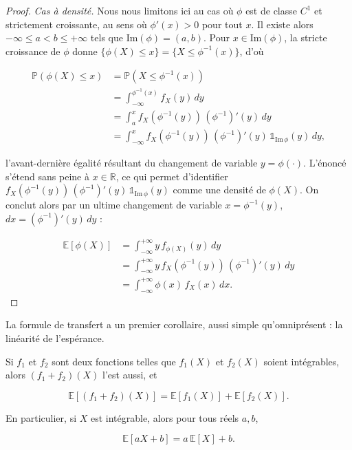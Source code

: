 \begin{proof}
\textit{Cas à densité.} Nous nous limitons ici au cas où $\phi$ est de classe $C^1$ et strictement croissante, au sens où $\phi'(x) > 0$ pour tout $x$. Il existe alors $-\infty \leq a < b \leq +\infty$ tels que $\text{Im}(\phi) = (a, b)$. Pour $x \in \text{Im}(\phi)$, la stricte croissance de $\phi$ donne $\{\phi(X) \leq x\} = \{X \leq \phi^{-1}(x)\}$, d'où

\begin{align*}
\mathbb{P}(\phi(X) \leq x) &= \mathbb{P}(X \leq \phi^{-1}(x)) \\
&= \int_{-\infty}^{\phi^{-1}(x)} f_X(y)\, dy \\
&= \int_a^x f_X(\phi^{-1}(y))\, (\phi^{-1})'(y)\, dy \\
&= \int_{-\infty}^x f_X(\phi^{-1}(y))\, (\phi^{-1})'(y)\, \mathbb{1}_{\text{Im}\,\phi}(y)\, dy,
\end{align*}

l'avant-dernière égalité résultant du changement de variable $y = \phi(\cdot)$. L'énoncé s'étend sans peine à $x \in \mathbb{R}$, ce qui permet d'identifier $f_X(\phi^{-1}(y))\, (\phi^{-1})'(y)\, \mathbb{1}_{\text{Im}\,\phi}(y)$ comme une densité de $\phi(X)$. On conclut alors par un ultime changement de variable $x = \phi^{-1}(y)$, $dx = (\phi^{-1})'(y)\, dy$ :

\begin{align*}
\mathbb{E}[\phi(X)] &= \int_{-\infty}^{+\infty} y\, f_{\phi(X)}(y)\, dy \\
&= \int_{-\infty}^{+\infty} y\, f_X(\phi^{-1}(y))\, (\phi^{-1})'(y)\, dy \\
&= \int_{-\infty}^{+\infty} \phi(x)\, f_X(x)\, dx.
\end{align*}
\end{proof}

La formule de transfert a un premier corollaire, aussi simple qu'omniprésent : la linéarité de l'espérance.

\medskip

\begin{mdframed}
\begin{corollaire}
Si $f_1$ et $f_2$ sont deux fonctions telles que $f_1(X)$ et $f_2(X)$ soient intégrables, alors $(f_1 + f_2)(X)$ l'est aussi, et

$$
\mathbb{E}[(f_1 + f_2)(X)] = \mathbb{E}[f_1(X)] + \mathbb{E}[f_2(X)].
$$

En particulier, si $X$ est intégrable, alors pour tous réels $a, b$,

$$
\mathbb{E}[aX + b] = a\, \mathbb{E}[X] + b.
$$
\end{corollaire}
\end{mdframed}

